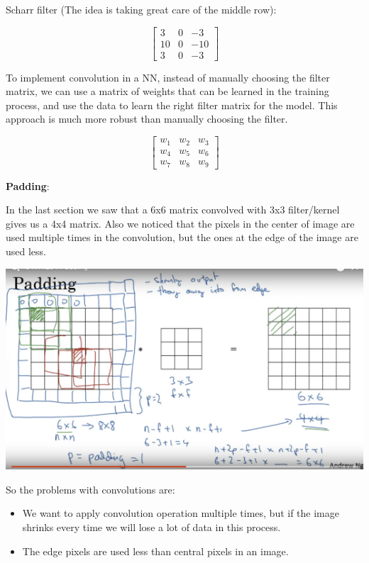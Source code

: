 \documentclass{article}
\begin{document}
\noindent Scharr filter (The idea is taking great care of the middle row):

\[
\begin{bmatrix}
3 & 0 & -3\\
10 & 0 & -10\\
3 & 0 & -3
\end{bmatrix}
\]

\noindent To implement convolution in a NN, instead of manually choosing the filter matrix, we can use a matrix of weights that can be learned in the training process, and use the data to learn the right filter matrix for the model. This approach is much more robust than manually choosing the filter.

\[
\begin{bmatrix}
w_{1} & w_{2} & w_{3}\\
w_{4} & w_{5} & w_{6}\\
w_{7} & w_{8} & w_{9}
\end{bmatrix}
\]

\noindent \textbf{Padding}:

\noindent In the last section we saw that a 6x6 matrix convolved with 3x3 filter/kernel gives us a 4x4 matrix. Also we noticed that the pixels in the center of image are used multiple times in the convolution, but the ones at the edge of the image are used less.

\begin{center}
\includegraphics[scale=0.4]{./images/padding.png}
\end{center}

\noindent So the problems with convolutions are:

\begin{itemize}
    \item We want to apply convolution operation multiple times, but if the image shrinks every time we will lose a lot of data in this process.
    \item The edge pixels are used less than central pixels in an image.
\end{itemize}
\end{document}
